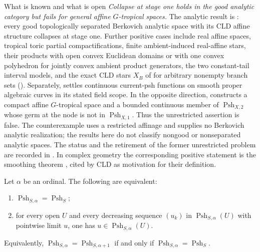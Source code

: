 \begin{warning}{What is known and what is open}
\emph{Collapse at stage one holds in the good analytic category but fails
for general affine $G$-tropical spaces.}
The analytic result is
: every good topologically
separated Berkovich analytic space with its CLD affine structure collapses at
stage one.  Further positive cases include real affine spaces, tropical toric
partial compactifications, finite
ambient-induced real-affine stars, their products with open convex Euclidean
domains or with one convex polyhedron for jointly convex ambient product
generators, the two constant-tail interval models, and the exact CLD stars
$X_B$ of \cite[\S6.7.3]{CLD25} for arbitrary nonempty branch sets
().  Separately,
 settles continuous
current-psh functions on smooth proper algebraic curves in its stated field
scope.  In the opposite direction,
 constructs a compact affine
$G$-tropical space and a bounded continuous member of
$\operatorname{Psh}_{X,2}$ whose germ at the node is not in
$\operatorname{Psh}_{X,1}$.  Thus the unrestricted assertion is false.  The
counterexample uses a restricted affinage and supplies no Berkovich analytic
realization; the results here do not classify nongood or nonseparated
analytic spaces.  The status and the retirement of the former unrestricted
problem are recorded in .  In complex
geometry the corresponding positive statement is the smoothing theorem
\cite{FN80}, cited by CLD as motivation for their definition.
\end{warning}

\begin{proposition}
\label{prop:ch15-collapse-reduction}
Let $\alpha$ be an ordinal.  The following are equivalent:
\begin{enumerate}
\item $\operatorname{Psh}_{S,\alpha}=\operatorname{Psh}_S$;
\item for every open $U$ and every decreasing sequence $(u_k)$ in
  $\operatorname{Psh}_{S,\alpha}(U)$ with pointwise limit $u$, one has
  $u\in\operatorname{Psh}_{S,\alpha}(U)$.
\end{enumerate}
Equivalently, $\operatorname{Psh}_{S,\alpha}=\operatorname{Psh}_{S,\alpha+1}$
if and only if $\operatorname{Psh}_{S,\alpha}=\operatorname{Psh}_S$.
\end{proposition}


